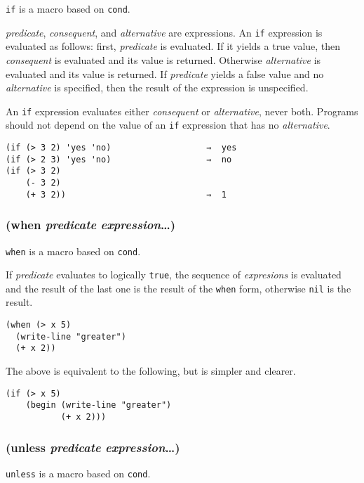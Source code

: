 \documentclass{article}
\begin{document}
\verb|if| is a macro based on \verb|cond|.

\emph{predicate}, \emph{consequent}, and \emph{alternative} are expressions. An \verb|if|
expression is evaluated as follows: first, \emph{predicate} is evaluated. If it yields a true
value, then \emph{consequent} is evaluated and its value is returned. Otherwise
\emph{alternative} is evaluated and its value is returned. If \emph{predicate} yields a false
value and no \emph{alternative} is specified, then the result of the expression is
unspecified.

An \verb|if| expression evaluates either \emph{consequent} or \emph{alternative}, never
both. Programs should not depend on the value of an \verb|if| expression that has no
\emph{alternative}.

\begin{verbatim}
(if (> 3 2) 'yes 'no)                   ⇒  yes
(if (> 2 3) 'yes 'no)                   ⇒  no
(if (> 3 2)
    (- 3 2)
    (+ 3 2))                            ⇒  1
\end{verbatim}

\subsubsection{(when \emph{predicate} \emph{expression}\ldots{})}

\verb|when| is a macro based on \verb|cond|.

If \emph{predicate} evaluates to logically \verb|true|, the sequence of \emph{expresions} is
evaluated and the result of the last one is the result of the \verb|when| form, otherwise
\verb|nil| is the result.

\begin{verbatim}
(when (> x 5)
  (write-line "greater")
  (+ x 2))
\end{verbatim}

The above is equivalent to the following, but is simpler and clearer.

\begin{verbatim}
(if (> x 5)
    (begin (write-line "greater")
           (+ x 2)))
\end{verbatim}

\subsubsection{(unless \emph{predicate} \emph{expression}\ldots{})}

\verb|unless| is a macro based on \verb|cond|.
\end{document}
